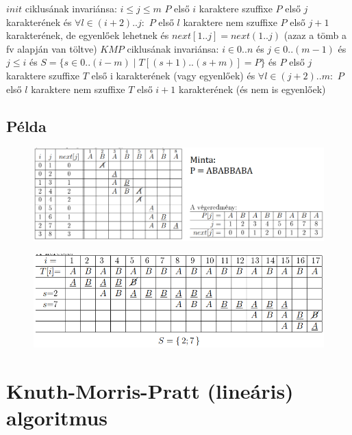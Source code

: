 \documentclass[12pt,a4paper]{article}
\begin{document}
\pagebreak

\begin{outline}
	\1 $init$ ciklusának invariánsa:
		\2 $i \le j \le m$
		\2 $P$ első $i$ karaktere szuffixe $P$ első $j$ karakterének
		\2 és $\forall l \in (i+2)..j:$ $P$ első $l$ karaktere nem szuffixe $P$ első $j+1$ karakterének, de egyenlőek lehetnek
		\2 és $next[1..j] = next(1..j)$ (azaz a tömb a fv alapján van töltve)
	\1 $KMP$ ciklusának invariánsa:
		\2 $i \in 0..n$ és $j \in 0..(m-1)$ és $j \le i$
		\2 és $S = \{ s \in 0..(i-m) \;|\; T[(s+1)..(s+m)] = P \}$
		\2 és $P$ első $j$ karaktere szuffixe $T$ első i karakterének (vagy egyenlőek)
		\2 és $\forall l \in (j+2)..m:$ $P$ első $l$ karaktere nem szuffixe $T$ első $i+1$ karakterének (és nem is egyenlőek)
\end{outline}

\subsection{Példa}

\begin{figure}[h!]
	\centering
	\includegraphics[width=1\linewidth]{KMP-példa-init}
\end{figure}

\begin{figure}[h!]
	\centering
	\includegraphics[width=1\linewidth]{KMP-példa-kmp}
\end{figure}

\pagebreak

\section{Knuth-Morris-Pratt (lineáris) algoritmus}
\end{document}
